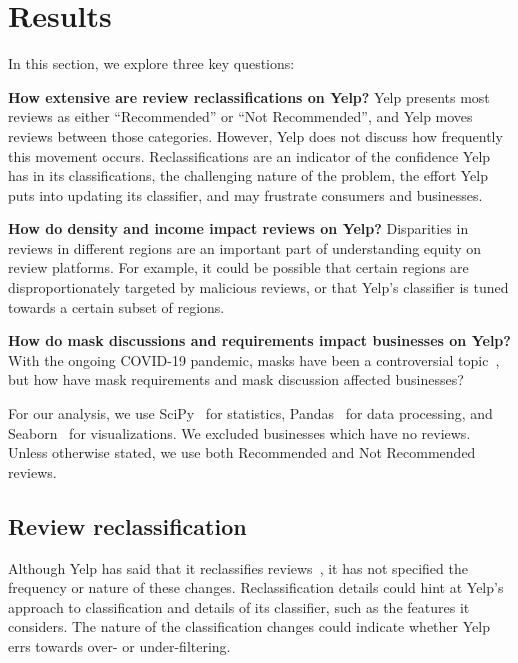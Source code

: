 \section{Results} \label{sec:rim:results}

In this section, we explore three key questions:

\textbf{How extensive are review reclassifications on Yelp?} Yelp presents most reviews as either ``Recommended'' or ``Not Recommended'', and Yelp moves reviews between those categories. However, Yelp does not discuss how frequently this movement occurs. Reclassifications are an indicator of the confidence Yelp has in its classifications, the challenging nature of the problem, the effort Yelp puts into updating its classifier, and may frustrate consumers and businesses.

\textbf{How do density and income impact reviews on Yelp?} Disparities in reviews in different regions
are an important part of understanding equity on review platforms. For example, it could be possible that certain regions are disproportionately targeted by malicious reviews, or that Yelp's classifier is tuned towards a certain subset of regions.

\textbf{How do mask discussions and requirements impact businesses on Yelp?} With the ongoing COVID-19 pandemic, masks have been a controversial topic~\cite{pascual2021toxicity}, but how have mask requirements and mask discussion affected businesses?

For our analysis, we use SciPy~\cite{2020SciPy-NMeth} for statistics, Pandas~\cite{mckinney-proc-scipy-2010} for data processing, and Seaborn~\cite{waskom2020seaborn} for visualizations. We excluded businesses which have no reviews. Unless otherwise stated, we use both Recommended and Not Recommended reviews.


\subsection{Review reclassification} \label{subsec:review_reclassification}


Although Yelp has said that it reclassifies reviews~\cite{yelp2010recommend}, it has not specified the frequency or nature of these changes. Reclassification details could hint at Yelp's approach to classification and details of its classifier, such as the features it considers. The nature of the classification changes could indicate whether Yelp errs towards over- or under-filtering.

